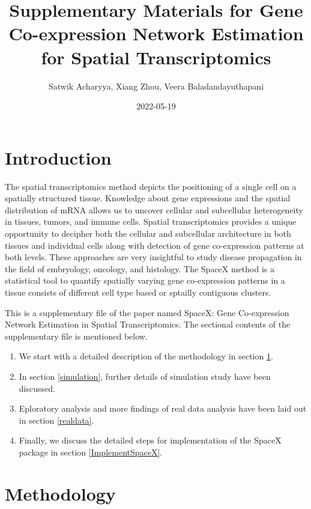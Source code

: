 \documentclass[
]{book}
\title{Supplementary Materials for Gene Co-expression Network Estimation for Spatial Transcriptomics}
\author{Satwik Acharyya, Xiang Zhou, Veera Baladandayuthapani}
\date{2022-05-19}
\providecommand{\tightlist}{%
  \setlength{\itemsep}{0pt}\setlength{\parskip}{0pt}}
\begin{document}
\maketitle

{
\setcounter{tocdepth}{1}
\tableofcontents
}
\hypertarget{appendix-supplementary-materials}{%
\appendix}


\hypertarget{introduction}{%
\chapter*{Introduction}\label{introduction}}

The spatial transcriptomics method depicts the positioning of a single cell on a spatially structured tissue. Knowledge about gene expressions and the spatial distribution of mRNA allows us to uncover cellular and subcellular heterogeneity in tissues, tumors, and immune cells. Spatial transcriptomics provides a unique opportunity to decipher both the cellular and subcellular architecture in both tissues and individual cells along with detection of gene co-expression patterns at both levels. These approaches are very insightful to study disease propagation in the field of embryology, oncology, and histology. The SpaceX method is a statistical tool to quantify spatially varying gene co-expression patterns in a tissue consists of different cell type based or sptailly contiguous clusters.

This is a supplementary file of the paper named SpaceX: Gene Co-expression Network Estimation in Spatial Transcriptomics. The sectional contents of the supplementary file is mentioned below.

\begin{enumerate}
\def\labelenumi{\arabic{enumi}.}
\tightlist
\item
  We start with a detailed description of the methodology in section \ref{method}.
\item
  In section \ref{simulation}, further details of simulation study have been discussed.
\item
  Eploratory analysis and more findings of real data analysis have been laid out in section \ref{realdata}.
\item
  Finally, we discuss the detailed steps for implementation of the SpaceX package in section \ref{ImplementSpaceX}.
\end{enumerate}

\hypertarget{method}{%
\chapter{Methodology}\label{method}}
\end{document}
